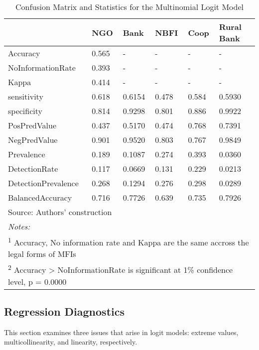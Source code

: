 \documentclass[a4paper,nobind]{templates/ociamthesis}
\begin{document}
\begin{table}

\caption{\label{tab:unnamed-chunk-30}Confusion Matrix and Statistics for the Multinomial Logit Model}
\centering
\begin{tabular}[t]{llllll}
\toprule
  & NGO & Bank & NBFI & Coop & Rural Bank\\
\midrule
Accuracy & 0.565 & - & - & - & -\\
NoInformationRate & 0.393 & - & - & - & -\\
Kappa & 0.414 & - & - & - & -\\
sensitivity & 0.618 & 0.6154 & 0.478 & 0.584 & 0.5930\\
specificity & 0.814 & 0.9298 & 0.801 & 0.886 & 0.9922\\
\addlinespace
PosPredValue & 0.437 & 0.5170 & 0.474 & 0.768 & 0.7391\\
NegPredValue & 0.901 & 0.9520 & 0.803 & 0.767 & 0.9849\\
Prevalence & 0.189 & 0.1087 & 0.274 & 0.393 & 0.0360\\
DetectionRate & 0.117 & 0.0669 & 0.131 & 0.229 & 0.0213\\
DetectionPrevalence & 0.268 & 0.1294 & 0.276 & 0.298 & 0.0289\\
\addlinespace
BalancedAccuracy & 0.716 & 0.7726 & 0.639 & 0.735 & 0.7926\\
\bottomrule
\multicolumn{6}{l}{\rule{0pt}{1em}Source: Authors' construction}\\
\multicolumn{6}{l}{\rule{0pt}{1em}\textit{Notes: }}\\
\multicolumn{6}{l}{\rule{0pt}{1em}\textsuperscript{1} Accuracy, No information rate and Kappa are the same accross the legal forms of MFIs}\\
\multicolumn{6}{l}{\rule{0pt}{1em}\textsuperscript{2} Accuracy > NoInformationRate is significant at 1\% confidence level, p = 0.0000}\\
\end{tabular}
\end{table}

\newpage

\hypertarget{regression-diagnostics}{%
\subsection{Regression Diagnostics}\label{regression-diagnostics}}

This section examines three issues that arise in logit models: extreme values, multicollinearity, and linearity, respectively.
\end{document}
